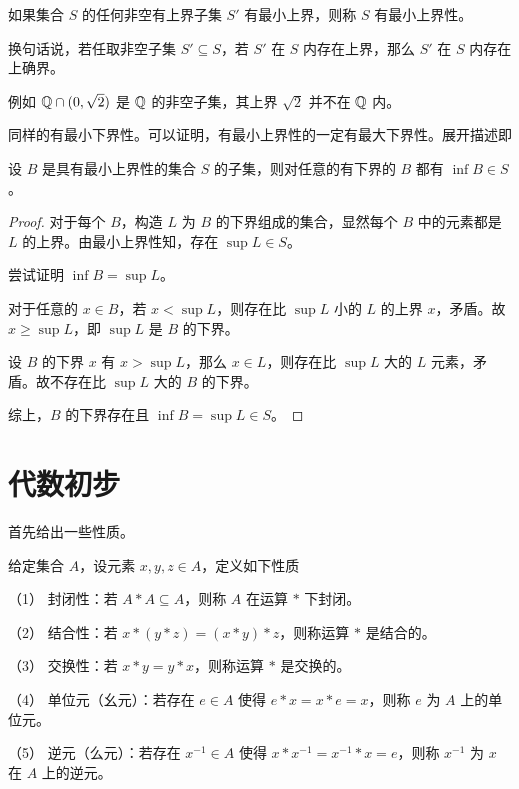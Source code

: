 \begin{definition}[最小上界性]
	如果集合 $S$ 的任何非空有上界子集 $S'$ 有最小上界，则称 $S$ 有最小上界性。

	换句话说，若任取非空子集 $S' \subseteq S$，若 $S'$ 在 $S$ 内存在上界，那么 $S'$ 在 $S$ 内存在上确界。
\end{definition}



例如 $\mathbb{Q} \cap (0,\sqrt2)$ 是 $\mathbb{Q}$ 的非空子集，其上界 $\sqrt2$ 并不在 $\mathbb{Q}$ 内。

同样的有最小下界性。可以证明，有最小上界性的一定有最大下界性。展开描述即

\begin{theorem}
	设 $B$ 是具有最小上界性的集合 $S$ 的子集，则对任意的有下界的 $B$ 都有 $\inf B \in S$。
\end{theorem}

\begin{proof}
	对于每个 $B$，构造 $L$ 为 $B$ 的下界组成的集合，显然每个 $B$ 中的元素都是 $L$ 的上界。由最小上界性知，存在 $\sup L \in S$。

	尝试证明 $\inf B=\sup L$。

	对于任意的 $x\in B$，若 $x<\sup L$，则存在比 $\sup L$ 小的 $L$ 的上界 $x$，矛盾。故 $x \geqslant \sup L$，即 $\sup L$ 是 $B$ 的下界。

	设 $B$ 的下界 $x$ 有 $x>\sup L$，那么 $x\in L$，则存在比 $\sup L$ 大的 $L$ 元素，矛盾。故不存在比 $\sup L$ 大的 $B$ 的下界。

	综上，$B$ 的下界存在且 $\inf B=\sup L \in S$。
\end{proof}

\section{代数初步}

首先给出一些性质。

\begin{definition}
	给定集合 $A$，设元素 $x, y, z \in A$，定义如下性质

	（1） 封闭性：若 $A \ast A \subseteq A$，则称 $A$ 在运算 $\ast$ 下封闭。

	（2） 结合性：若 $x \ast (y \ast z) = (x \ast y) \ast z$，则称运算 $\ast$ 是结合的。

	（3） 交换性：若 $x \ast y = y \ast x$，则称运算 $\ast$ 是交换的。

	（4） 单位元（幺元）：若存在 $e \in A$ 使得 $e \ast x = x \ast e = x$，则称 $e$ 为 $A$ 上的单位元。

	（5） 逆元（么元）：若存在 $x^{-1} \in A$ 使得 $x \ast x^{-1} = x^{-1} \ast x = e$，则称 $x^{-1}$ 为 $x$ 在 $A$ 上的逆元。
\end{definition}

